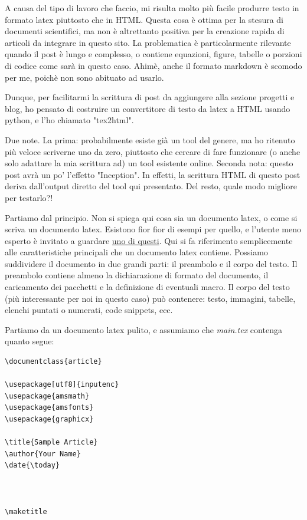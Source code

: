 A causa del tipo di lavoro che faccio, mi risulta molto più facile produrre testo in formato latex piuttosto che in HTML. Questa cosa è ottima per la stesura di documenti scientifici, ma non è altrettanto positiva per la creazione rapida di articoli da integrare in questo sito. La problematica è particolarmente rilevante quando il post è lungo e complesso, o contiene equazioni, figure, tabelle o porzioni di codice come sarà in questo caso. Ahimè, anche il formato markdown è scomodo per me, poichè non sono abituato ad usarlo. 

Dunque, per facilitarmi la scrittura di post da aggiungere alla sezione progetti e blog, ho pensato di costruire un convertitore di testo da latex a HTML usando python, e l'ho chiamato "tex2html". 


Due note. La prima: probabilmente esiste già un tool del genere, ma ho ritenuto più veloce scriverne uno da zero, piuttosto che cercare di fare funzionare (o anche solo adattare la mia scrittura ad) un tool esistente online. Seconda nota: questo post avrà un po' l'effetto "Inception". In effetti, la scrittura HTML di questo post deriva dall'output diretto del tool qui presentato. Del resto, quale modo migliore per testarlo?!

Partiamo dal principio. Non si spiega qui cosa sia un documento latex, o come si scriva un documento latex. Esistono fior fior di esempi per quello, e l'utente meno esperto è invitato a guardare \href{https://youtu.be/QY2zdhSY48M?si=zuePtIGop0Fpnocp}{uno di questi}.
Qui si fa riferimento semplicemente alle caratteristiche principali che un documento latex contiene. Possiamo suddividere il documento in due grandi parti: il preambolo e il corpo del testo. Il preambolo contiene almeno la dichiarazione di formato del documento, il caricamento dei pacchetti e la definizione di eventuali macro. Il corpo del testo (più interessante per noi in questo caso) può contenere: testo, immagini, tabelle, elenchi puntati o numerati, code snippets, ecc. 

Partiamo da un documento latex pulito, e assumiamo che \textit{main.tex} contenga quanto segue:
\begin{verbatim}
\documentclass{article}

\usepackage[utf8]{inputenc}
\usepackage{amsmath}
\usepackage{amsfonts}
\usepackage{graphicx}

\title{Sample Article}
\author{Your Name}
\date{\today}



\maketitle




\end{verbatim}

